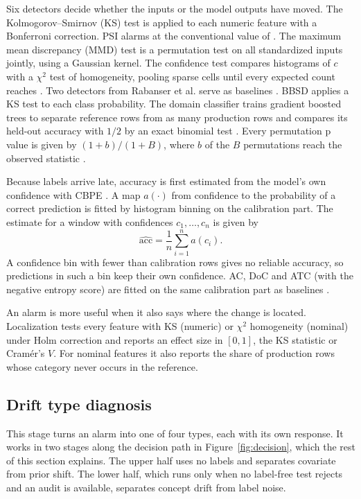 \documentclass[10pt]{article}
\newcommand{\keep}[1]{\needspace{#1\baselineskip}}
\begin{document}
Six detectors decide whether the inputs or the model outputs have moved. The Kolmogorov--Smirnov (KS) test is applied to each numeric feature with a Bonferroni correction. PSI alarms at the conventional value of  \cite{siddiqi2006}. The maximum mean discrepancy (MMD) test \cite{gretton2012kernel} is a permutation test on all standardized inputs jointly, using a Gaussian kernel. The confidence test compares histograms of $c$ with a $\chi^2$ test of homogeneity, pooling sparse cells until every expected count reaches  \cite{cochran1954}. Two detectors from Rabanser et al. serve as baselines \cite{rabanser2019failing}. BBSD applies a KS test to each class probability. The domain classifier trains gradient boosted trees to separate  reference rows from as many production rows and compares its held-out accuracy with $1/2$ by an exact binomial test \cite{lopezpaz2017c2st}. Every permutation p value is given by $(1+b)/(1+B)$, where $b$ of the $B$ permutations reach the observed statistic \cite{phipson2010}.

Because labels arrive late, accuracy is first estimated from the model's own confidence with CBPE \cite{kivimaki2025performance}. A map $a(\cdot)$ from confidence to the probability of a correct prediction is fitted by histogram binning on the calibration part. The estimate for a window with confidences $c_1,\dots,c_n$ is given by
\begin{equation}
\widehat{\mathrm{acc}} = \frac{1}{n}\sum_{i=1}^{n} a(c_i).
\label{eq:cbpe}
\end{equation}
A confidence bin with fewer than  calibration rows gives no reliable accuracy, so predictions in such a bin keep their own confidence. AC, DoC and ATC (with the negative entropy score) are fitted on the same calibration part as baselines \cite{hendrycks2017baseline,guillory2021predicting,garg2022atc}.

An alarm is more useful when it also says where the change is located. Localization tests every feature with KS (numeric) or $\chi^2$ homogeneity (nominal) under Holm correction and reports an effect size in $[0,1]$, the KS statistic or Cram\'er's $V$. For nominal features it also reports the share of production rows whose category never occurs in the reference.

\keep{21}\subsection{Drift type diagnosis}
\label{sec:diagnosis}
This stage turns an alarm into one of four types, each with its own response. It works in two stages along the decision path in Figure~\ref{fig:decision}, which the rest of this section explains. The upper half uses no labels and separates covariate from prior shift. The lower half, which runs only when no label-free test rejects and an audit is available, separates concept drift from label noise.
\end{document}
